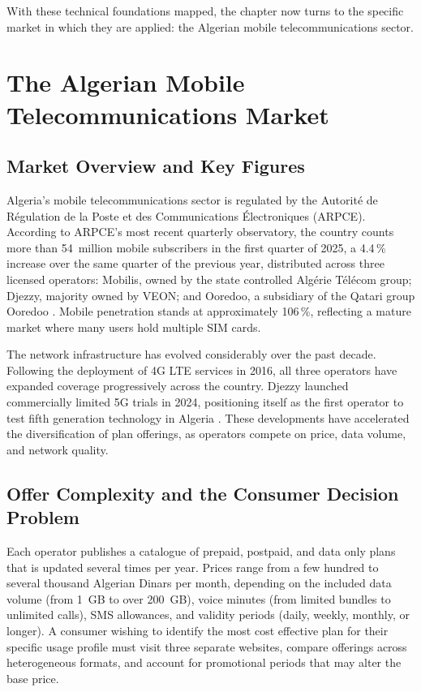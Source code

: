 With these technical foundations mapped, the chapter now turns to the specific market in which they are applied: the Algerian mobile telecommunications sector.

\section{The Algerian Mobile Telecommunications Market}

\subsection{Market Overview and Key Figures}

Algeria's mobile telecommunications sector is regulated by the Autorité de Régulation de la Poste et des Communications Électroniques (ARPCE). According to ARPCE's most recent quarterly observatory, the country counts more than 54~million mobile subscribers in the first quarter of 2025, a 4.4\,\% increase over the same quarter of the previous year, distributed across three licensed operators: Mobilis, owned by the state controlled Algérie Télécom group; Djezzy, majority owned by VEON; and Ooredoo, a subsidiary of the Qatari group Ooredoo \parencite{ARPCE2025, ARPCE2024, Statista2024}. Mobile penetration stands at approximately 106\,\%, reflecting a mature market where many users hold multiple SIM cards.

The network infrastructure has evolved considerably over the past decade. Following the deployment of 4G LTE services in 2016, all three operators have expanded coverage progressively across the country. Djezzy launched commercially limited 5G trials in 2024, positioning itself as the first operator to test fifth generation technology in Algeria \parencite{GSMA2024}. These developments have accelerated the diversification of plan offerings, as operators compete on price, data volume, and network quality.

\subsection{Offer Complexity and the Consumer Decision Problem}

Each operator publishes a catalogue of prepaid, postpaid, and data only plans that is updated several times per year. Prices range from a few hundred to several thousand Algerian Dinars per month, depending on the included data volume (from 1~GB to over 200~GB), voice minutes (from limited bundles to unlimited calls), SMS allowances, and validity periods (daily, weekly, monthly, or longer). A consumer wishing to identify the most cost effective plan for their specific usage profile must visit three separate websites, compare offerings across heterogeneous formats, and account for promotional periods that may alter the base price.

